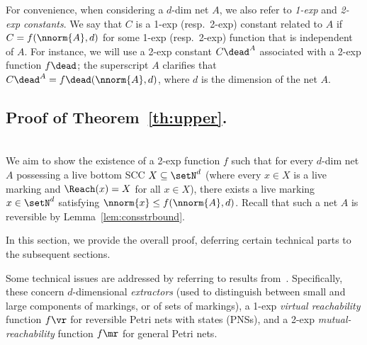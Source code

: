 For convenience, when considering a $d$-dim net $A$, we also
refer to \emph{1-exp} and \emph{2-exp constants}. We say that $C$ is a 1-exp (resp.~2-exp)
constant related to $A$ if
$C=f(\nnorm{A},d)$ for some 1-exp (resp.~2-exp) function that is independent of $A$.
For instance, we will use a 2-exp constant $C\dead^A$ associated
with a 2-exp function $f\dead$; the superscript $A$ clarifies that 
$C\dead^A=f\dead(\nnorm{A},d)$, where $d$ is the dimension of the net $A$.

\subsection{Proof of
Theorem~\ref{th:upper}.}\label{sec:infproof}
\hfill\\

We aim to show the existence of a 2-exp function $f$ such that for every $d$-dim
net $A$ possessing a live bottom SCC $X\subseteq\setN^d$ (where every
$x\in X$ is a live marking and $\Reach(x)=X$ for all
$x\in X$),
 there exists a live marking
$x\in\setN^d$ satisfying $\nnorm{x}\leq f(\nnorm{A},d)$.
 Recall that 
such a net $A$ is reversible by Lemma~\ref{lem:consstrbound}.

In this section, we provide the overall proof, deferring certain
technical parts 
to the subsequent sections.

\begin{rem}\label{rem:Lerresults}
Some technical issues are addressed by referring to results from~\cite{DBLP:conf/fsttcs/Leroux19}. Specifically, these concern
$d$-dimensional \emph{extractors} (used to distinguish between small
	and large components of markings, or of sets of markings),
a 1-exp \emph{virtual reachability} function $f\vr$ for reversible
	Petri nets with states (PNSs), and 
	a 2-exp \emph{mutual-reachability} function $f\mr$ for general
	Petri nets.
\end{rem}


